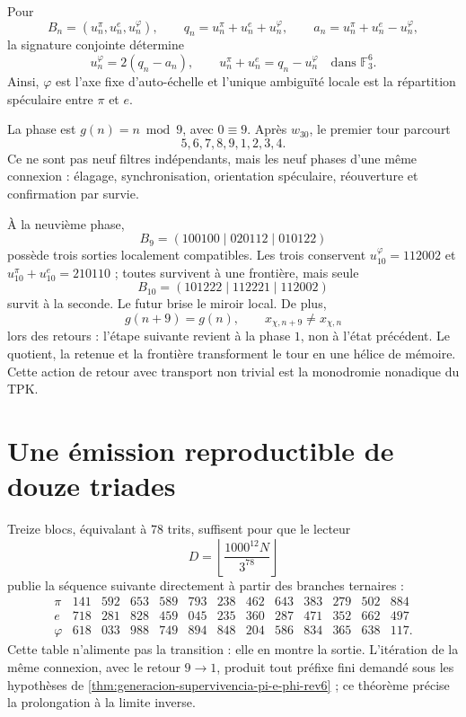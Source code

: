 Pour
\[
B_n=(u_n^\pi,u_n^e,u_n^\varphi),\qquad
q_n=u_n^\pi+u_n^e+u_n^\varphi,\qquad
a_n=u_n^\pi+u_n^e-u_n^\varphi,
\]
la signature conjointe détermine
\[
u_n^\varphi=2(q_n-a_n),\qquad
u_n^\pi+u_n^e=q_n-u_n^\varphi
\quad\text{dans }\mathbb F_3^6.
\]
Ainsi, \(\varphi\) est l'axe fixe d'auto-échelle et l'unique ambiguïté locale
est la répartition spéculaire entre \(\pi\) et \(e\).

La phase est \(g(n)=n\bmod9\), avec \(0\equiv9\). Après \(w_{30}\), le
premier tour parcourt
\[
5,6,7,8,9,1,2,3,4.
\]
Ce ne sont pas neuf filtres indépendants, mais les neuf phases d'une même
connexion : élagage, synchronisation, orientation spéculaire, réouverture et
confirmation par survie.

À la neuvième phase,
\[
B_9=(100100\mid020112\mid010122)
\]
possède trois sorties localement compatibles. Les trois conservent
\(u_{10}^\varphi=112002\) et
\(u_{10}^\pi+u_{10}^e=210110\) ; toutes survivent à une frontière, mais seule
\[
\boxed{B_{10}=(101222\mid112221\mid112002)}
\]
survit à la seconde. Le futur brise le miroir local. De plus,
\[
g(n+9)=g(n),\qquad x_{\chi,n+9}\ne x_{\chi,n}
\]
lors des retours : l'étape suivante revient à la phase \(1\), non à l'état
précédent. Le quotient, la retenue et la frontière transforment le tour en une
hélice de mémoire. Cette action de retour avec transport non trivial est la
monodromie nonadique du TPK.

\section{Une émission reproductible de douze triades}

Treize blocs, équivalant à \(78\) trits, suffisent pour que le lecteur
\[
D=\left\lfloor\frac{1000^{12}N}{3^{78}}\right\rfloor
\]
publie la séquence suivante directement à partir des branches ternaires :
\[
\begin{array}{c|rrrrrrrrrrrr}
\pi&141&592&653&589&793&238&462&643&383&279&502&884\\
e&718&281&828&459&045&235&360&287&471&352&662&497\\
\varphi&618&033&988&749&894&848&204&586&834&365&638&117.
\end{array}
\]
Cette table n'alimente pas la transition : elle en montre la sortie. L'itération de la
même connexion, avec le retour \(9\to1\), produit tout préfixe fini
demandé sous les hypothèses de
\cref{thm:generacion-supervivencia-pi-e-phi-rev6} ; ce théorème précise la
prolongation à la limite inverse.

